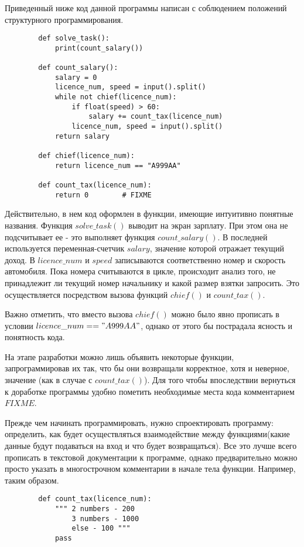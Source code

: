 \documentclass[a4paper, fleqn]{article}
\begin{document}
	Приведенный ниже код данной программы написан с соблюдением положений структурного программирования. 
	
	\begin{lstlisting}
		def solve_task():
			print(count_salary())
			
		def count_salary():
			salary = 0
			licence_num, speed = input().split()
			while not chief(licence_num):
				if float(speed) > 60:
					salary += count_tax(licence_num)
				licence_num, speed = input().split()
			return salary
			
		def chief(licence_num):
			return licence_num == "A999AA"
			
		def count_tax(licence_num):
			return 0		# FIXME		
	\end{lstlisting}
	
	Действительно, в нем код оформлен в функции, имеющие интуитивно понятные названия. Функция $solve\_task()$ выводит на экран зарплату. При этом она не подсчитывает ее - это выполняет функция $count\_salary()$. В последней используется переменная-счетчик $salary$, значение которой отражает текущий доход. В $licence\_num$ и $speed$ записываются соответственно номер и скорость автомобиля. Пока номера считываются в цикле, происходит анализ того, не принадлежит ли текущий номер начальнику и какой размер взятки запросить. Это осуществляется посредством вызова функций $chief()$ и $count\_tax()$. 
	
	Важно отметить, что вместо вызова $chief()$ можно было явно прописать в условии $licence\_num == "A999AA"$, однако от этого бы пострадала ясность и понятность кода.
	
	На этапе разработки можно лишь объявить некоторые функции, запрограммировав их так, что бы они возвращали корректное, хотя и неверное, значение (как в случае с $count\_tax()$).
	Для того чтобы впоследствии вернуться к доработке программы удобно пометить необходимые места кода комментарием $FIXME$. 
	
	
	
	Прежде чем начинать программировать, нужно спроектировать программу: определить, как будет осуществляться взаимодействие между функциями(какие данные будут подаваться на вход и что будет возвращаться). Все это лучше всего прописать в текстовой документации к программе, однако предварительно можно просто указать в многострочном комментарии в начале тела функции. Например, таким образом.
	
	\begin{lstlisting}
		def count_tax(licence_num):	
			""" 2 numbers - 200
				3 numbers - 1000
				else - 100 """	
			pass
	\end{lstlisting}
	
\end{document}
